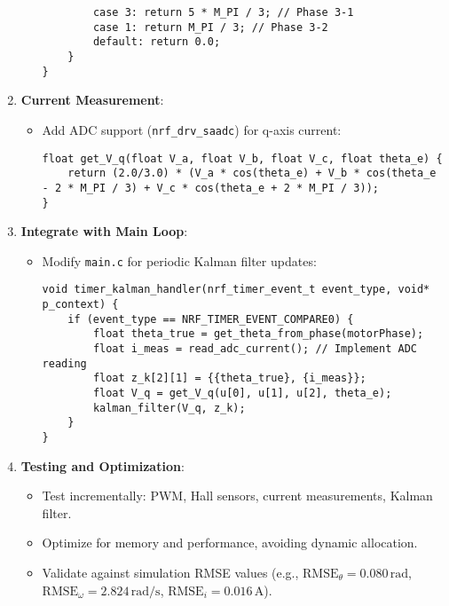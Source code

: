 \documentclass[a4paper,11pt]{article}
\begin{document}
\begin{enumerate}
\begin{itemize}
\begin{lstlisting}
        case 3: return 5 * M_PI / 3; // Phase 3-1
        case 1: return M_PI / 3; // Phase 3-2
        default: return 0.0;
    }
}
        \end{lstlisting}
    \end{itemize}
    \item \textbf{Current Measurement}:
    \begin{itemize}
        \item Add ADC support (\texttt{nrf\_drv\_saadc}) for q-axis current:
        \begin{lstlisting}
float get_V_q(float V_a, float V_b, float V_c, float theta_e) {
    return (2.0/3.0) * (V_a * cos(theta_e) + V_b * cos(theta_e - 2 * M_PI / 3) + V_c * cos(theta_e + 2 * M_PI / 3));
}
        \end{lstlisting}
    \end{itemize}
    \item \textbf{Integrate with Main Loop}:
    \begin{itemize}
        \item Modify \texttt{main.c} for periodic Kalman filter updates:
        \begin{lstlisting}
void timer_kalman_handler(nrf_timer_event_t event_type, void* p_context) {
    if (event_type == NRF_TIMER_EVENT_COMPARE0) {
        float theta_true = get_theta_from_phase(motorPhase);
        float i_meas = read_adc_current(); // Implement ADC reading
        float z_k[2][1] = {{theta_true}, {i_meas}};
        float V_q = get_V_q(u[0], u[1], u[2], theta_e);
        kalman_filter(V_q, z_k);
    }
}
        \end{lstlisting}
    \end{itemize}
    \item \textbf{Testing and Optimization}:
    \begin{itemize}
        \item Test incrementally: PWM, Hall sensors, current measurements, Kalman filter.
        \item Optimize for memory and performance, avoiding dynamic allocation.
        \item Validate against simulation RMSE values (e.g., $\text{RMSE}_\theta = 0.080 \, \text{rad}$, $\text{RMSE}_\omega = 2.824 \, \text{rad/s}$, $\text{RMSE}_i = 0.016 \, \text{A}$).
    \end{itemize}
\end{enumerate}

\end{document}
